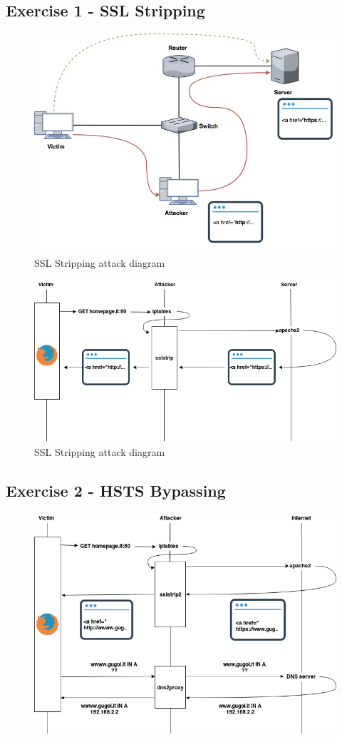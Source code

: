 \documentclass{article}
\begin{document}
\subsection{Exercise 1 - SSL Stripping}
\begin{figure}[h]
  \center
  \includegraphics[width=.8\textwidth]{../figures/sslstrip}
  \caption{SSL Stripping attack diagram}
\end{figure}
\begin{figure}[h]
  \center
  \includegraphics[width=.8\textwidth]{../figures/sslstrip_time}
  \caption{SSL Stripping attack diagram}
\end{figure}

\subsection{Exercise 2 - HSTS Bypassing}
\begin{figure}[h]
  \includegraphics[width=.9\textwidth]{../figures/hsts_bypass_time}
  \caption{}
\end{figure}
\end{document}
